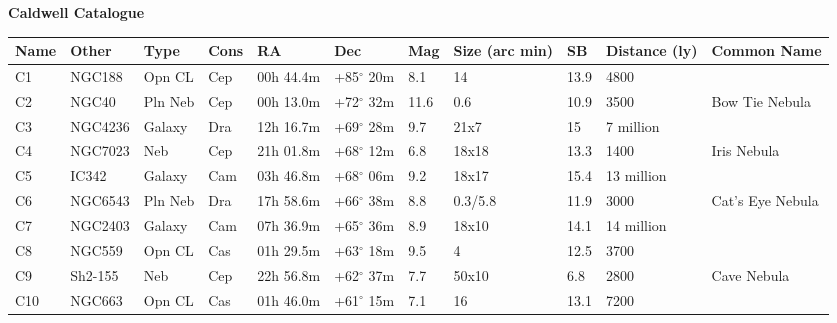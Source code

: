 \newpage
\noindent

{\bf Caldwell Catalogue} 
\begin{longtable}{@{}lllllllllll@{}}
\hline
{\bf Name} & {\bf Other} & {\bf Type} & {\bf Cons} & {\bf RA}  & {\bf Dec} & {\bf Mag} & {\bf Size (arc min)} & {\bf SB} & {\bf Distance (ly)} & {\bf Common Name}               \\
\hline
C1         & NGC188      & Opn CL     & Cep       & 00h 44.4m & +85$^{\circ}$ 20m  & 8.1       & 14                   & 13.9     & 4800                &                                 \\
C2         & NGC40       & Pln Neb    & Cep       & 00h 13.0m & +72$^{\circ}$ 32m  & 11.6      & 0.6                  & 10.9     & 3500                & Bow Tie Nebula                  \\
C3         & NGC4236     & Galaxy     & Dra       & 12h 16.7m & +69$^{\circ}$ 28m  & 9.7       & 21x7                 & 15       & 7 million           &                                 \\
C4         & NGC7023     & Neb        & Cep       & 21h 01.8m & +68$^{\circ}$ 12m  & 6.8       & 18x18                & 13.3     & 1400                & Iris Nebula                     \\
C5         & IC342       & Galaxy     & Cam       & 03h 46.8m & +68$^{\circ}$ 06m  & 9.2       & 18x17                & 15.4     & 13 million          &                                 \\
C6         & NGC6543     & Pln Neb    & Dra       & 17h 58.6m & +66$^{\circ}$ 38m  & 8.8       & 0.3/5.8              & 11.9     & 3000                & Cat's Eye Nebula                \\
C7         & NGC2403     & Galaxy     & Cam       & 07h 36.9m & +65$^{\circ}$ 36m  & 8.9       & 18x10                & 14.1     & 14 million          &                                 \\
C8         & NGC559      & Opn CL     & Cas       & 01h 29.5m & +63$^{\circ}$ 18m  & 9.5       & 4                    & 12.5     & 3700                &                                 \\
C9         & Sh2-155     & Neb        & Cep       & 22h 56.8m & +62$^{\circ}$ 37m  & 7.7       & 50x10                & 6.8      & 2800                & Cave Nebula                     \\
C10        & NGC663      & Opn CL     & Cas       & 01h 46.0m & +61$^{\circ}$ 15m  & 7.1       & 16                   & 13.1     & 7200                &                                 \\

\end{longtable}
